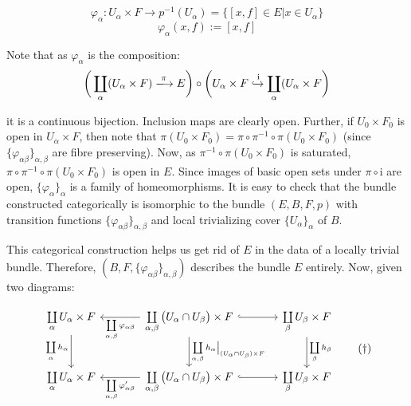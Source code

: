 \documentclass[11pt,a4paper]{article}
\begin{document}
$$\varphi_{\alpha} : U_{\alpha} \times F \rightarrow p^{-1}(U_{\alpha}) = \big\{[x, f] \in E  |  x \in U_{\alpha}\big\}$$
$$
\varphi_{\alpha}(x, f) := [x, f]$$


Note that as $\varphi_{\alpha}$ is the composition: $$\bigg(\coprod\limits_{\alpha}(U_{\alpha}\times F) \xlongrightarrow{\pi} E\bigg)\circ \bigg(U_{\alpha}\times F \xhookrightarrow{\text{i}} \coprod\limits_{\alpha}(U_{\alpha}\times F\bigg)$$


it is a continuous bijection. Inclusion maps are clearly open. Further, if $U_0\times F_0$ is open in $U_{\alpha}\times F$, then note that $\pi(U_0\times F_0) = \pi\circ\pi^{-1}\circ\pi(U_0\times F_0)$ (since $\{\varphi_{\alpha\beta}\}_{\alpha, \beta}$ are fibre preserving). Now, as $\pi^{-1}\circ \pi(U_0\times F_0)$ is saturated, $\pi\circ\pi^{-1}\circ\pi(U_0\times F_0)$ is open in $E$. Since images of basic open sets under $\pi\circ\text{i}$ are open, $\{\varphi_{\alpha}\}_{\alpha}$ is a family of homeomorphisms. It is easy to check that the bundle constructed categorically is isomorphic to the bundle $(E, B, F, p)$ with transition functions $\{\varphi_{\alpha\beta}\}_{\alpha, \beta}$ and local trivializing cover $\{U_{\alpha}\}_{\alpha}$ of $B$.

This categorical construction helps us get rid of $E$ in the data of a locally trivial bundle. Therefore, $(B, F, \{\varphi_{\alpha\beta}\}_{\alpha, \beta})$ describes the bundle $E$ entirely. Now, given two diagrams:

\begin{equation*}
\begin{tikzcd}[column sep = large, row sep = large]
\coprod\limits_{\alpha}U_{\alpha}\cross F \arrow[d, "\coprod\limits_{\alpha}h_{\alpha}"'] & \coprod\limits_{\alpha, \beta}\big(U_{\alpha}\cap U_{\beta}\big)\cross F \arrow[l, "\coprod\limits_{\alpha, \beta}\varphi_{\alpha\beta}"] \arrow[d, "\coprod\limits_{\alpha, \beta}h_{\alpha}\big|_{(U_{\alpha}\cap U_{\beta})\cross F}"] \arrow[hookrightarrow]{r} & \coprod\limits_{\beta}U_{\beta}\cross F \arrow[d, "\coprod\limits_{\beta}h_{\beta}"] \\ \coprod\limits_{\alpha}U_{\alpha}\cross F & \coprod\limits_{\alpha, \beta}\big(U_{\alpha}\cap U_{\beta}\big)\cross F \arrow[l, "\coprod\limits_{\alpha, \beta}\varphi'_{\alpha\beta}"]  \arrow[hookrightarrow]{r} & \coprod\limits_{\beta}U_{\beta}\cross F
\end{tikzcd} \tag{†}
\end{equation*}
\end{document}

